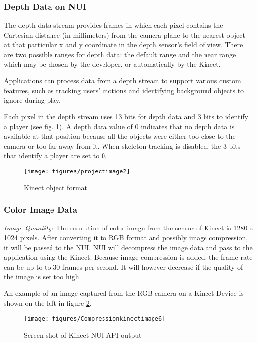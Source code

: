 \subsubsection{Depth Data on NUI}
The depth data stream provides frames in which each pixel contains the Cartesian distance (in millimeters) from the camera plane to the nearest object at that particular x and y coordinate in the depth sensor's field of view. There are two possible ranges for depth data: the default range and the near range which may be chosen by the developer, or automatically by the Kinect.

Applications can process data from a depth stream to support various custom features, such as tracking users' motions and identifying background objects to ignore during play.

Each pixel in the depth stream uses 13 bits for depth data and 3 bits to identify a player (see fig. \ref{fig:humobject}). A depth data value of 0 indicates that no depth data is available at that position because all the objects were either too close to the camera or too far away from it. When skeleton tracking is disabled, the 3 bits that identify a player are set to 0.

\begin{figure}[hbt]
  \center
        \texttt{[image: figures/projectimage2]}
        \caption{Kinect object format}
  \label{fig:humobject}
\end{figure}

\subsubsection{Color Image Data}
\textit{Image Quantity:} 
The resolution of color image from the sensor of Kinect is 1280 x 1024 pixels. After converting it to RGB format and possibly image compression, it will be passed to the NUI. NUI will decompress the image data and pass to the application using the Kinect. Because image compression is added, the frame rate can be up to to 30 frames per second. It will however decrease if the quality of the image is set too high.

An example of an image captured from the RGB camera on a Kinect Device is shown on the left in figure \ref{fig:kinectcaptureimage}.

\begin{figure}[hbt]
  \center
        \texttt{[image: figures/Compressionkinectimage6]}
        \caption{Screen shot of Kinect NUI API output}
  \label{fig:kinectcaptureimage}
\end{figure}

